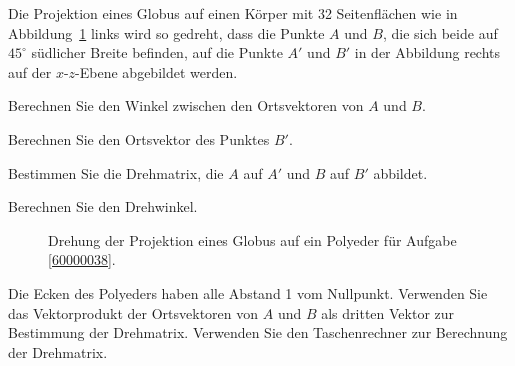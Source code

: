 Die Projektion eines Globus auf einen Körper mit 32 Seitenflächen
wie in Abbildung~\ref{60000038:image} links wird so gedreht, dass die Punkte
$A$ und $B$, die sich beide auf $45^\circ$ südlicher Breite befinden,
auf die Punkte $A'$ und $B'$ in der Abbildung rechts auf der $x$-$z$-Ebene
abgebildet werden.
\begin{teilaufgaben}
\item
Berechnen Sie den Winkel zwischen den Ortsvektoren
von $A$ und $B$.
\item
Berechnen Sie den Ortsvektor des Punktes $B'$.
\item
Bestimmen Sie die Drehmatrix, die $A$ auf $A'$ und $B$ auf $B'$ abbildet.
\item
Berechnen Sie den Drehwinkel.
\end{teilaufgaben}
\begin{figure}[ht]
\centering
{}
\caption{Drehung der Projektion eines Globus auf ein Polyeder für Aufgabe
\ref{60000038}.
\label{60000038:image}}
\end{figure}

\begin{hinweis}
Die Ecken des Polyeders haben alle Abstand 1 vom Nullpunkt.
Verwenden Sie das Vektorprodukt der Ortsvektoren von $A$ und $B$ als
dritten Vektor zur Bestimmung der Drehmatrix.
Verwenden Sie den Taschenrechner zur Berechnung der Drehmatrix.
\end{hinweis}

